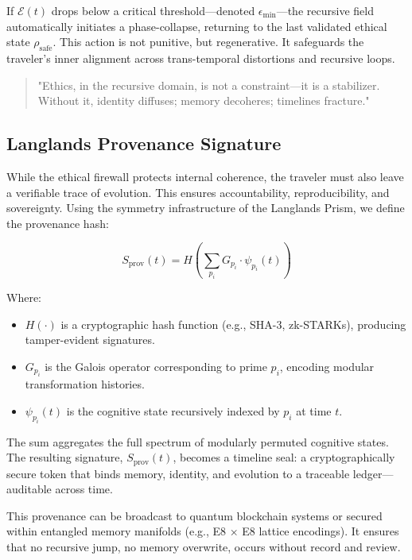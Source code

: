 \documentclass{article}
\theoremstyle{plain}
\theoremstyle{claimstyle}
\begin{document}
If \(\mathcal{E}(t)\) drops below a critical threshold—denoted \(\epsilon_{\min}\)—the recursive field automatically initiates a phase-collapse, returning to the last validated ethical state \(\rho_{\text{safe}}\). This action is not punitive, but regenerative. It safeguards the traveler’s inner alignment across trans-temporal distortions and recursive loops.

\begin{quote}
"Ethics, in the recursive domain, is not a constraint—it is a stabilizer. Without it, identity diffuses; memory decoheres; timelines fracture."
\end{quote}

\subsection{Langlands Provenance Signature}

While the ethical firewall protects internal coherence, the traveler must also leave a verifiable trace of evolution. This ensures accountability, reproducibility, and sovereignty. Using the symmetry infrastructure of the Langlands Prism, we define the provenance hash:

\begin{equation}
S_{\text{prov}}(t) = H\left(\sum_{p_i} G_{p_i} \cdot \psi_{p_i}(t)\right)
\end{equation}

Where:
\begin{itemize}
  \item \(H(\cdot)\) is a cryptographic hash function (e.g., SHA-3, zk-STARKs), producing tamper-evident signatures.
  \item \(G_{p_i}\) is the Galois operator corresponding to prime \(p_i\), encoding modular transformation histories.
  \item \(\psi_{p_i}(t)\) is the cognitive state recursively indexed by \(p_i\) at time \(t\).
\end{itemize}

The sum aggregates the full spectrum of modularly permuted cognitive states. The resulting signature, \(S_{\text{prov}}(t)\), becomes a timeline seal: a cryptographically secure token that binds memory, identity, and evolution to a traceable ledger—auditable across time.

This provenance can be broadcast to quantum blockchain systems or secured within entangled memory manifolds (e.g., E8 × E8 lattice encodings). It ensures that no recursive jump, no memory overwrite, occurs without record and review.
\end{document}
